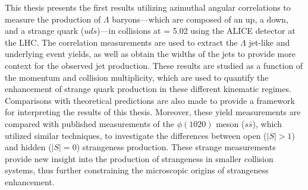 This thesis presents the first results utilizing azimuthal angular correlations to measure the production of $\Lambda$ baryons---which are composed of an up, a down, and a strange quark ($uds$)---in \pPb collisions at \snn = 5.02 \TeV using the ALICE detector at the LHC. The correlation measurements are used to extract the $\Lambda$ jet-like and underlying event yields, as well as obtain the widths of the jets to provide more context for the observed jet production. These results are studied as a function of the \lmb momentum and collision multiplicity, which are used to quantify the enhancement of strange quark production in these different kinematic regimes. Comparisons with theoretical predictions are also made to provide a framework for interpreting the results of this thesis. Moreover, these yield measurements are compared with published measurements of the $\phi(1020)$ meson ($s\bar{s}$), which utilized similar techniques, to investigate the differences between open ($|S| > 1$) and hidden ($|S| = 0$) strangeness production. These strange measurements provide new insight into the production of strangeness in smaller collision systems, thus further constraining the microscopic origins of strangeness enhancement.
